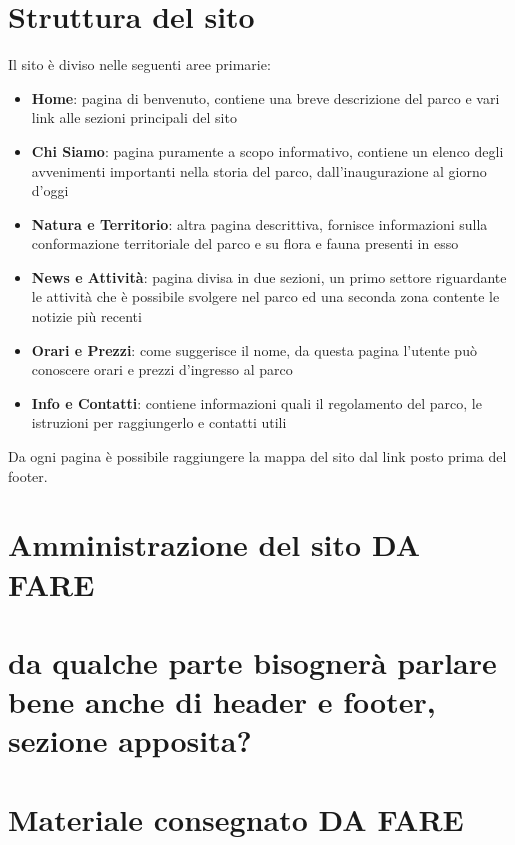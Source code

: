 \documentclass[12pt]{article}
\begin{document}
\section{Struttura del sito}
Il sito \`e diviso nelle seguenti aree primarie: 
		\begin{itemize}
			\item \textbf{Home}: pagina di benvenuto, contiene una breve descrizione del parco e vari link alle sezioni principali del sito
			\item \textbf{Chi Siamo}: pagina puramente a scopo informativo, contiene un elenco degli avvenimenti importanti nella storia del parco, dall'inaugurazione al giorno d'oggi
			\item \textbf{Natura e Territorio}: altra pagina descrittiva, fornisce informazioni sulla conformazione territoriale del parco e su flora e fauna presenti in esso
			\item \textbf{News e Attivit\`a}: pagina divisa in due sezioni, un primo settore riguardante le attivit\`a che \`e possibile svolgere nel parco ed una seconda zona contente le notizie più recenti
			\item \textbf{Orari e Prezzi}: come suggerisce il nome, da questa pagina l'utente può conoscere orari e prezzi d'ingresso al parco
			\item \textbf{Info e Contatti}: contiene informazioni quali il regolamento del parco, le istruzioni per raggiungerlo e contatti utili
		\end{itemize}				
Da ogni pagina \`e possibile raggiungere la mappa del sito dal link posto prima del footer.		
\section{Amministrazione del sito DA FARE}

\section{da qualche parte bisognerà parlare bene anche di header e footer, sezione apposita?}

			\section{Materiale consegnato DA FARE}
			
\end{document}
